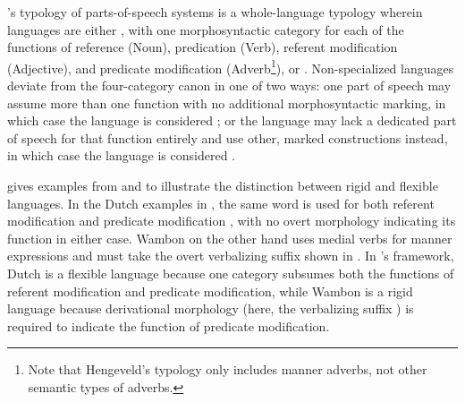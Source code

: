 \citeauthor{Hengeveld1992}'s \parencite*[Ch.~4]{Hengeveld1992} typology of parts-of-speech systems is a whole-language typology wherein languages are either , with one morphosyntactic category for each of the functions of reference (Noun), predication (Verb), referent modification (Adjective), and predicate modification (Adverb\footnote{Note that Hengeveld's typology only includes manner adverbs, not other semantic types of adverbs.}), or . Non-specialized languages deviate from the four-category canon in one of two ways: one part of speech may assume more than one function with no additional morphosyntactic marking, in which case the language is considered ; or the language may lack a dedicated part of speech for that function entirely and use other, marked constructions instead, in which case the language is considered .

\citeauthor{Hengeveld1992} gives examples from  and  to illustrate the distinction between rigid and flexible languages. In the Dutch examples in , the same word  is used for both referent modification  and predicate modification , with no overt morphology indicating its function in either case. Wambon on the other hand uses medial verbs for manner expressions and must take the overt verbalizing suffix  shown in . In \citeauthor{Hengeveld1992}'s framework, Dutch is a flexible language because one category subsumes both the functions of referent modification and predicate modification, while Wambon is a rigid language because derivational morphology (here, the verbalizing suffix ) is required to indicate the function of predicate modification.

